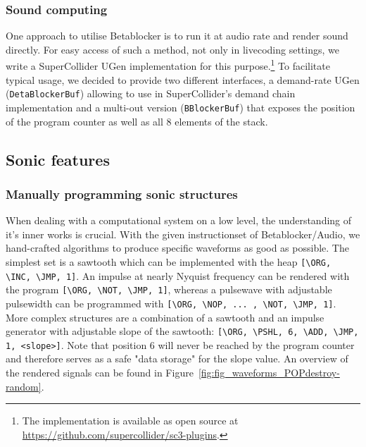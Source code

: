 \documentclass[letterpaper, 12pt]{article}
\begin{document}
\subsubsection{Sound computing} 
\label{sub:sound_computing}

One approach to utilise Betablocker is to run it at audio rate and render sound directly.
For easy access of such a method, not only in livecoding settings, we write a SuperCollider UGen implementation for this purpose.\footnote{The implementation is available as open source at \url{https://github.com/supercollider/sc3-plugins}.}
To facilitate typical usage, we decided to provide two different interfaces, a demand-rate UGen (\verb#DetaBlockerBuf#) allowing to use in SuperCollider's demand chain implementation 
and a multi-out version (\verb#BBlockerBuf#) that exposes the position of the program counter as well as all 8 elements of the stack.




\subsection{Sonic features} 
\label{sub:sonic_features}



\subsubsection{Manually programming sonic structures}
\label{sub:manual_programming_sonic_structures}

When dealing with a computational system on a low level, the understanding of it's inner works is crucial.
With the given instructionset of Betablocker/Audio, we hand-crafted algorithms to produce specific waveforms as good as possible.
The simplest set is a sawtooth which can be implemented with the heap \verb#[\ORG, \INC, \JMP, 1]#.
An impulse at nearly Nyquist frequency can be rendered with the program \verb#[\ORG, \NOT, \JMP, 1]#, whereas a pulsewave with adjustable pulsewidth can be programmed with \verb#[\ORG, \NOP, ... , \NOT, \JMP, 1]#.
More complex structures are a combination of a sawtooth and an impulse generator with adjustable slope of the sawtooth: \verb#[\ORG, \PSHL, 6, \ADD, \JMP, 1, <slope>]#. Note that position 6 will never be reached by the program counter and therefore serves as a safe "data storage" for the slope value.
An overview of the rendered signals can be found in Figure~\ref{fig:fig_waveforms_POPdestroy-random}.
\end{document}
